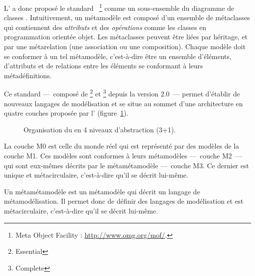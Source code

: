 L'{\omg} a donc proposé le standard {\mof}~\cite{omgmof}\footnote{Meta Object
Facility : \url{http://www.omg.org/mof/}.} comme un sous-ensemble du
diagramme de classes {\uml}. Intuitivement, un métamodèle est composé d'un
ensemble de métaclasses qui contiennent des \emph{attributs} et des
\emph{opérations} comme les classes en programmation orientée objet. Les
métaclasses peuvent être liées par héritage, et par une métarelation
(une association ou une composition). Chaque modèle doit se conformer à un
tel métamodèle, c'est-à-dire être un ensemble d'éléments,
d'attributs et de relations entre les éléments se conformant à leurs
métadéfinitions.

Ce standard {\mof} ---~composé de {\emof}\footnote{Essential {\mof}} et {\cmof}\footnote{Complete {\mof}} depuis la version 2.0~---
permet d'établir de nouveaux langages de modélisation et se situe au sommet
d'une architecture en quatre couches proposée par l'{\omg} (figure~\ref{fig:mdalevels}).

\begin{figure}[h]%
  \begin{center}
    
    \caption{Organisation du {\mda} en 4 niveaux d'abstraction (3+1).}
    \label{fig:mdalevels}
  \end{center}
\end{figure}

La couche M0 est celle du monde réel qui est représenté par des modèles de la
couche M1. Ces modèles sont conformes à leurs métamodèles ---~couche M2~--- qui
sont eux-mêmes décrits par le métamétamodèle {\mof} ---~couche M3. Ce dernier est
unique et métacirculaire, c'est-à-dire qu'il se décrit lui-même.

\begin{definition}[Métamétamodèle]
Un métamétamodèle est un métamodèle qui décrit un langage de métamodélisation.
Il permet donc de définir des langages de modélisation et est métacirculaire,
c'est-à-dire qu'il se décrit lui-même.
\end{definition}


